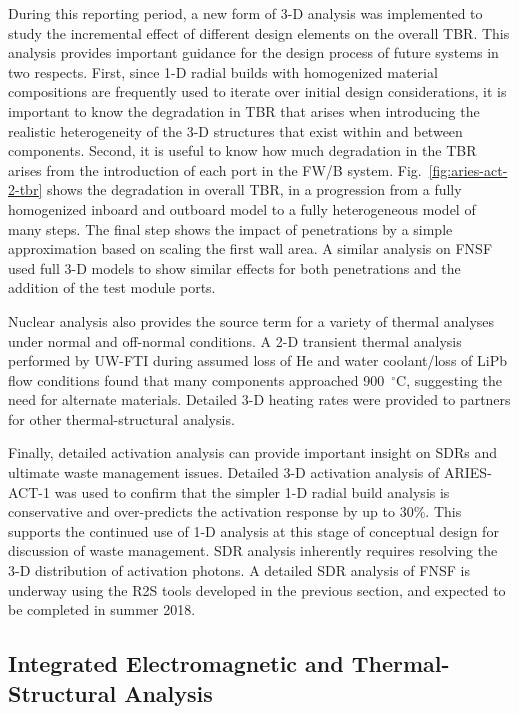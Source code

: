 During this reporting period, a new form of 3-D analysis was implemented to
study the incremental effect of different design elements on the overall
\gls{TBR}.  This analysis provides important guidance for the design process
of future systems in two respects.  First, since 1-D radial builds with
homogenized material compositions are frequently used to iterate over initial
design considerations, it is important to know the degradation in \gls{TBR}
that arises when introducing the realistic heterogeneity of the 3-D structures
that exist within and between components.  Second, it is useful to know how
much degradation in the \gls{TBR} arises from the introduction of each port in
the \gls{FW/B} system.  Fig.\ \ref{fig:aries-act-2-tbr} shows the degradation
in overall \gls{TBR}, in a progression from a fully homogenized inboard and
outboard model to a fully heterogeneous model of many steps.  The final step
shows the impact of penetrations by a simple approximation based on scaling
the first wall area.  A similar analysis on FNSF used full 3-D models to show
similar effects for both penetrations and the addition of the test module
ports.

Nuclear analysis also provides the source term for a variety of thermal
analyses under normal and off-normal conditions.  A 2-D transient thermal
analysis performed by \gls{UW-FTI} during assumed loss of He and water
coolant/loss of LiPb flow conditions found that many components approached
900\ $^\circ$C, suggesting the need for alternate materials.  Detailed 3-D
heating rates were provided to partners for other thermal-structural analysis.

Finally, detailed activation analysis can provide important insight on
\glspl{SDR} and ultimate waste management issues.  Detailed 3-D activation
analysis of ARIES-ACT-1 was used to confirm that the simpler 1-D radial build
analysis is conservative and over-predicts the activation response by up to
30\%.  This supports the continued use of 1-D analysis at this stage of
conceptual design for discussion of waste management.  \gls{SDR} analysis
inherently requires resolving the 3-D distribution of activation photons.  A
detailed \gls{SDR} analysis of FNSF is underway using the \gls{R2S} tools
developed in the previous section, and expected to be completed in summer
2018.

\subsection{Integrated Electromagnetic and Thermal-Structural Analysis}

